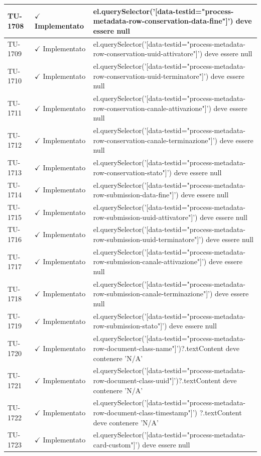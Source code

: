 ﻿\documentclass[a4paper,12pt]{article}
\newcommand{\ok}{\textcolor{green!60!black}{$\checkmark$ Implementato}}
\begin{document}
\begin{longtable}{|p{2cm}|p{3.5cm}|p{9.5cm}|}
\hline
TU-1708 & \ok & el.querySelector('[data-testid="process-metadata-row-conservation-data-fine"]') deve essere null \\
\hline
TU-1709 & \ok & el.querySelector('[data-testid="process-metadata-row-conservation-uuid-attivatore"]') deve essere null \\
\hline
TU-1710 & \ok & el.querySelector('[data-testid="process-metadata-row-conservation-uuid-terminatore"]') deve essere null \\
\hline
TU-1711 & \ok & el.querySelector('[data-testid="process-metadata-row-conservation-canale-attivazione"]') deve essere null \\
\hline
TU-1712 & \ok & el.querySelector('[data-testid="process-metadata-row-conservation-canale-terminazione"]') deve essere null \\
\hline
TU-1713 & \ok & el.querySelector('[data-testid="process-metadata-row-conservation-stato"]') deve essere null \\
\hline
TU-1714 & \ok & el.querySelector('[data-testid="process-metadata-row-submission-data-fine"]') deve essere null \\
\hline
TU-1715 & \ok & el.querySelector('[data-testid="process-metadata-row-submission-uuid-attivatore"]') deve essere null \\
\hline
TU-1716 & \ok & el.querySelector('[data-testid="process-metadata-row-submission-uuid-terminatore"]') deve essere null \\
\hline
TU-1717 & \ok & el.querySelector('[data-testid="process-metadata-row-submission-canale-attivazione"]') deve essere null \\
\hline
TU-1718 & \ok & el.querySelector('[data-testid="process-metadata-row-submission-canale-terminazione"]') deve essere null \\
\hline
TU-1719 & \ok & el.querySelector('[data-testid="process-metadata-row-submission-stato"]') deve essere null \\
\hline
TU-1720 & \ok & el.querySelector('[data-testid="process-metadata-row-document-class-name"]')?.textContent deve contenere 'N/A' \\
\hline
TU-1721 & \ok & el.querySelector('[data-testid="process-metadata-row-document-class-uuid"]')?.textContent deve contenere 'N/A' \\
\hline
TU-1722 & \ok & el.querySelector('[data-testid="process-metadata-row-document-class-timestamp"]') ?.textContent deve contenere 'N/A' \\
\hline
TU-1723 & \ok & el.querySelector('[data-testid="process-metadata-card-custom"]') deve essere null \\

\end{longtable}
\end{document}
